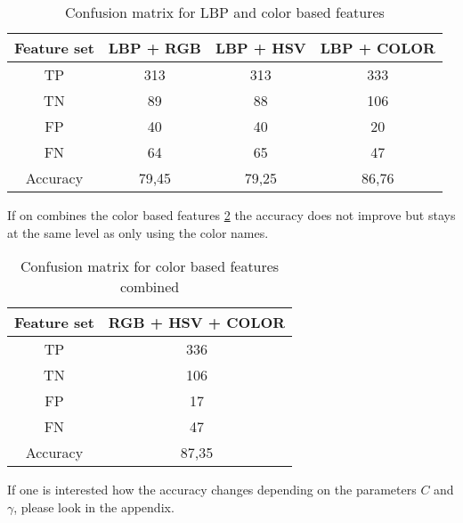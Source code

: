 \FloatBarrier
\begin{table}[h!]
	\begin{center}
		\caption{Confusion matrix for LBP and color based features}
		\begin{tabular}{|c|c|c|c|}
			\hline
			Feature set & LBP + RGB & LBP + HSV & LBP + COLOR   \\ \hline
			    TP      &    313    &    313    &     333       \\ \hline
			    TN      &    89     &    88     &     106       \\ \hline
			    FP      &    40     &    40     &     20        \\ \hline
			    FN      &    64     &    65     &     47        \\ \hline
			 Accuracy   &   79,45   &   79,25   &    86,76      \\ \hline
		\end{tabular}
		\label{table:lbp_features}
	\end{center}
\end{table}
\FloatBarrier

If on combines the color based features \cref{table:color_features} the accuracy does not improve but stays at the same level as only using the color names. 

\FloatBarrier
\begin{table}[h!]
	\begin{center}
		\caption{Confusion matrix for color based features combined}
		\begin{tabular}{|c|c|}
			\hline
			Feature set & RGB + HSV + COLOR \\ \hline
			    TP      &    336    \\ \hline
			    TN      &    106     \\ \hline
			    FP      &    17     \\ \hline
			    FN      &    47     \\ \hline
			 Accuracy   &   87,35   \\ \hline
		\end{tabular}
		
		\label{table:color_features}
	\end{center}
\end{table}
\FloatBarrier

If one is interested how the accuracy changes depending on the parameters $C$ and $\gamma$, please look in the appendix. 





